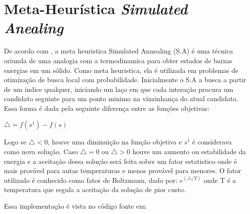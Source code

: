 \documentclass[12pt]{article}
\begin{document}
\section*{Meta-Heurística \textit{Simulated Anealing}}

De acordo com \cite{KirkSA}, a meta heuristica Simulated Annealing (S.A) é uma técnica oriunda de uma analogia com a termodinamica para obter estados de baixas energias em um sólido. Como meta heuristica, ela é utilizada em problemas de otimização de busca local com probabilidade. 
Inicialmente o S.A a busca a partir de um indice qualquer, iniciando um laço em que cada interação procura um candidato seguinte para um ponto minimo na vinzinhança do atual candidato. Essa forma é dada pela seguinte diferença entre as funções objetivas:

$ {\triangle = f (s^1) - f(s) }$

Logo se $ {\triangle < 0 }$, houve uma diminuição na função objetiva e $ s^1$ é considerava como nova solução. Caso $ {\triangle = 0 }$ ou $ {\triangle > 0 }$ houve um aumento ou estabilidade da energia e a aceitação dessa solução será feita sobre um fator estatistico onde é mais provável para autas temperaturas e menos provável para menores. O fator utilizado é conhecido como fator de Boltzmann, dado por: $ {e^{(\triangle / T)} }$ onde T é a temperatura que regula a aceitação da solução de pior custo.

Essa implementação é vista no código fonte em:
\end{document}
